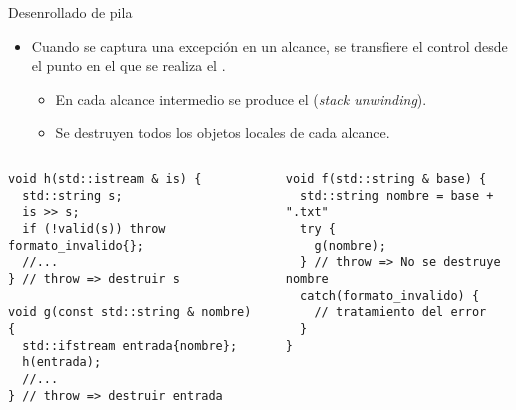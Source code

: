 \begin{frame}[t,fragile]{Desenrollado de pila}
\begin{itemize}
  \item Cuando se captura una excepción en un alcance, se transfiere el control
        desde el punto en el que se realiza el .
    \begin{itemize}
      \item En cada alcance intermedio se produce el  (\emph{stack unwinding}).
      \item Se destruyen todos los objetos locales de cada alcance.
    \end{itemize}
\end{itemize}

\begin{columns}[T]

\begin{lstlisting}
void h(std::istream & is) {
  std::string s;
  is >> s;
  if (!valid(s)) throw formato_invalido{};
  //...
} // throw => destruir s

void g(const std::string & nombre) {
  std::ifstream entrada{nombre};
  h(entrada);
  //...
} // throw => destruir entrada
\end{lstlisting}

\begin{lstlisting}
void f(std::string & base) {
  std::string nombre = base + ".txt"
  try {
    g(nombre);
  } // throw => No se destruye nombre
  catch(formato_invalido) {
    // tratamiento del error
  }
}
\end{lstlisting}
\end{columns}

\end{frame}

